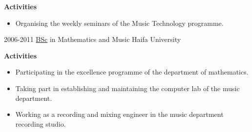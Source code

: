 \documentclass[]{friggeri-cv}
\begin{document}
\begin{entrylist}
{    \textbf{Activities}
    \begin{itemize}
      \item
        Organising the weekly seminars of the Music Technology programme.
    \end{itemize}
  }

  \entry
  {2006-2011}
  {\href{http://www.tomgurion.me/pdfs/BSc.pdf}{BSc} in Mathematics and Music}
  {Haifa University}
  {
    \textbf{Activities}
    \begin{itemize}
      \item
        Participating in the excellence programme of the department of mathematics.
      \item
        Taking part in establishing and maintaining the computer lab of the music department.
      \item
        Working as a recording and mixing engineer in the music department recording studio.
    \end{itemize}
  }

\end{entrylist}
\end{document}
